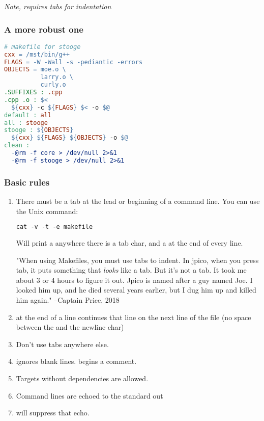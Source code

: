 \textit{Note, requires tabs for indentation}

\subsubsection{A more robust one}

\begin{lstlisting}[language=make]
# makefile for stooge
cxx = /mst/bin/g++
FLAGS = -W -Wall -s -pediantic -errors
OBJECTS = moe.o \
          larry.o \
          curly.o
.SUFFIXES : .cpp
.cpp .o : $<
  ${cxx} -c ${FLAGS} $< -o $@
default : all
all : stooge
stooge : ${OBJECTS}
  ${cxx} ${FLAGS} ${OBJECTS} -o $@
clean : 
  -@rm -f core > /dev/null 2>&1
  -@rm -f stooge > /dev/null 2>&1
\end{lstlisting}

\subsubsection{Basic rules}

\begin{enumerate}
  \item There must be a tab at the lead or beginning of a command line. You can use the Unix command:

  \begin{lstlisting}[language=make]
  cat -v -t -e makefile
  \end{lstlisting}

  Will print a  anywhere there is a tab char, and a \shellcmd{\$} at the end of every line.

  "When using Makefiles, you must use tabs to indent. In jpico, when you press tab, it puts something that \textit{looks} like a tab. But it's not a tab. It took me about 3 or 4 hours to figure it out. Jpico is named after a guy named Joe. I looked him up, and he died several years earlier, but I dug him up and killed him again." --Captain Price, 2018

  \item \shellcmd{\textbackslash} at the end of a line continues that line on the next line of the file (no space between the \shellcmd{\textbackslash} and the newline char)
  \item Don't use tabs anywhere else.
  \item \shellcmd{make} ignores blank lines. \shellcmd{\#} begins a comment. 
  \item Targets without dependencies are allowed.
  \item Command lines are echoed to the standard out
  \item \shellcmd{-@} will suppress that echo.
\end{enumerate}
